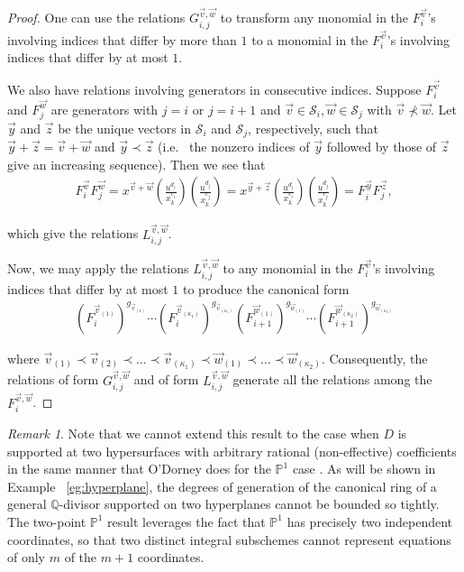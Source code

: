 \documentclass{amsart}
\theoremstyle{plain}
\theoremstyle{definition}
\theoremstyle{remark}
\newtheorem{rem}[thm]{Remark}
\numberwithin{equation}{section}
\newcommand\bq{{\mathbb Q}}
\newcommand\bp{{\mathbb P}}
\newcommand\mss{\mathscr{S}}
\begin{document}
\begin{proof}
One can use the relations $G_{i, j}^{\vec{v}, \vec{w}}$
to transform any monomial in the $F_i^{\vec{v}}$'s involving
indices that differ by more than $1$ to a monomial in the $F_i
^{\vec{v}}$'s involving indices that differ by at most $1$.

We also have relations involving generators in consecutive
indices. Suppose $F_i^{\vec{v}}$ and $F_j^{\vec{w}}$ are
generators with $j = i$ or $j = i + 1$ and $\vec{v} \in
\mss_i, \vec{w} \in \mss_j$ with $\vec{v} \not\prec \vec{w}$.
Let $\vec{y}$ and $\vec{z}$ be the unique vectors in $\mss_i$ and
$\mss_j$, respectively, such that $\vec{y} + \vec{z} = \vec{v} +
\vec{w}$ and $\vec{y} \prec \vec{z}$ (i.e.~ the nonzero indices
of $\vec{y}$ followed by those of $\vec{z}$ give an increasing
sequence). Then we see that
\begin{align*}
	F_i^{\vec{v}} F_j^{\vec{w}} = x^{\vec{v} + \vec{w}}
	\left(\frac{u^{d_i}}{x_k^{c_i}}\right)
	\left(\frac{u^{d_j}}{x_k^{c_j}}\right)
	= x^{\vec{y} + \vec{z}}
	\left(\frac{u^{d_i}}{x_k^{c_i}}\right)
	\left(\frac{u^{d_j}}{x_k^{c_j}}\right)
	= F_i^{\vec{y}} F_j^{\vec{z}},
\end{align*}

\noindent 
which give the relations $L_{i, j}^{\vec{v}, \vec{w}}$.

Now, we may apply the relations $L_{i, j}^{\vec{v}, \vec{w}}$
to any monomial in the $F_i^{\vec{v}}$'s involving
indices that differ by at most $1$ to produce the canonical form
\begin{align*}
	(F_i^{\vec{v}_{(1)}})^{g_{\vec{v}_{(1)}}} \cdots
	(F_i^{\vec{v}_{(\kappa_1)}})^{g_{\vec{v}_{(\kappa_1)}}}
	(F_{i + 1}^{\vec{w}_{(1)}})^{g_{\vec{w}_{(1)}}} \cdots
	(F_{i + 1}^{\vec{w}_{(\kappa_2)}})^{g_{\vec{w}_{(\kappa_2)}}}
\end{align*}

\noindent
where $\vec{v}_{(1)} \prec \vec{v}_{(2)} \prec \ldots \prec
\vec{v}_{(\kappa_1)} \prec \vec{w}_{(1)} \prec \ldots \prec
\vec{w}_{(\kappa_2)}$. Consequently, the relations of form
$G_{i, j}^{\vec{v}, \vec{w}}$ and of form $L_{i, j}^{\vec{v},
\vec{w}}$ generate all the relations among the $F_{i}^{\vec{v},
\vec{w}}$.
\end{proof}

\begin{rem}
\label{rem:proj-two-points}
Note that we cannot extend this result to the case when
$D$ is supported at two hypersurfaces with arbitrary rational (non-effective)
coefficients in the same manner that O'Dorney does for the
$\bp^1$ case \cite[Section 4]{dorney:canonical}. As will be shown
in Example ~\ref{eg:hyperplane}, the degrees of generation of the
canonical ring of a general $\bq$-divisor supported on two
hyperplanes cannot be bounded so tightly. The two-point
$\bp^1$ result leverages the fact that $\bp^1$ has precisely two
independent coordinates, so that two distinct integral subschemes
cannot represent equations of only $m$ of the $m+1$ coordinates.
\end{rem}
\end{document}
